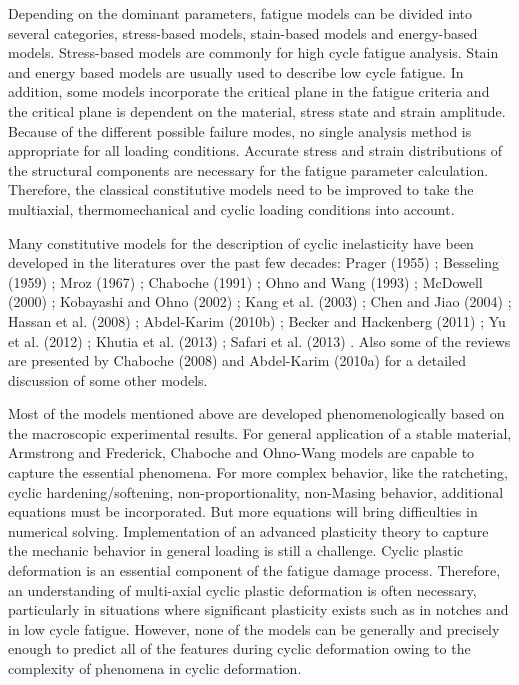 Depending on the dominant parameters, fatigue models can be divided into several categories, stress-based models, stain-based models and energy-based models.
Stress-based models are commonly for high cycle fatigue analysis.
Stain and energy based models are usually used to describe low cycle fatigue.
In addition, some models incorporate the critical plane in the fatigue criteria and the critical plane is dependent on the material, stress state and strain amplitude.
Because of the different possible failure modes, no single analysis method is appropriate for all loading conditions.
Accurate stress and strain distributions of the structural components are necessary for the fatigue parameter calculation.
Therefore, the classical constitutive models need to be improved to take the multiaxial, thermomechanical and cyclic loading conditions into account.

Many constitutive models for the description of cyclic inelasticity have been developed in the literatures over
the past few decades: Prager (1955) \cite{prager1955new}; Besseling (1959) \cite{besseling1959theory}; Mroz (1967) \cite{mroz1967description}; Chaboche (1991) \cite{Chaboche1991661}; Ohno and Wang (1993) \cite{Ohno1993375};
McDowell (2000) \cite{McDowell2000293}; Kobayashi and Ohno (2002) \cite{kobayashi2002implementation}; Kang et al. (2003) \cite{Kang20031801}; Chen and Jiao (2004) \cite{Chen2004871}; Hassan et al. (2008) \cite{Hassan20081863};
Abdel-Karim (2010b) \cite{AbdelKarim2010170}; Becker and Hackenberg (2011) \cite{Becker2011596}; Yu et al. (2012) \cite{Yu201288}; Khutia et al. (2013) \cite{Khutia201388}; Safari et al. (2013) \cite{Safari2013402}.
Also some of the reviews are presented by Chaboche (2008) \cite{Chaboche20081642} and Abdel-Karim (2010a) \cite{AbdelKarim2010711} for a detailed discussion of some other models.

Most of the models mentioned above are developed phenomenologically based on the macroscopic experimental results.
For general application of a stable material, Armstrong and Frederick, Chaboche and Ohno-Wang models are capable to capture the essential phenomena.
For more complex behavior, like the ratcheting, cyclic hardening/softening, non-proportionality, non-Masing behavior, additional equations must be incorporated.
But more equations will bring difficulties in numerical solving.
Implementation of an advanced plasticity theory to capture the mechanic behavior in general loading is still a challenge.
Cyclic plastic deformation is an essential component of the fatigue damage process.
Therefore, an understanding of multi-axial cyclic plastic deformation is often necessary, particularly in situations where significant plasticity exists such as in notches and in low cycle fatigue.
However, none of the models can be generally and precisely enough to predict all of the features during cyclic deformation owing to the complexity of phenomena in cyclic deformation.

